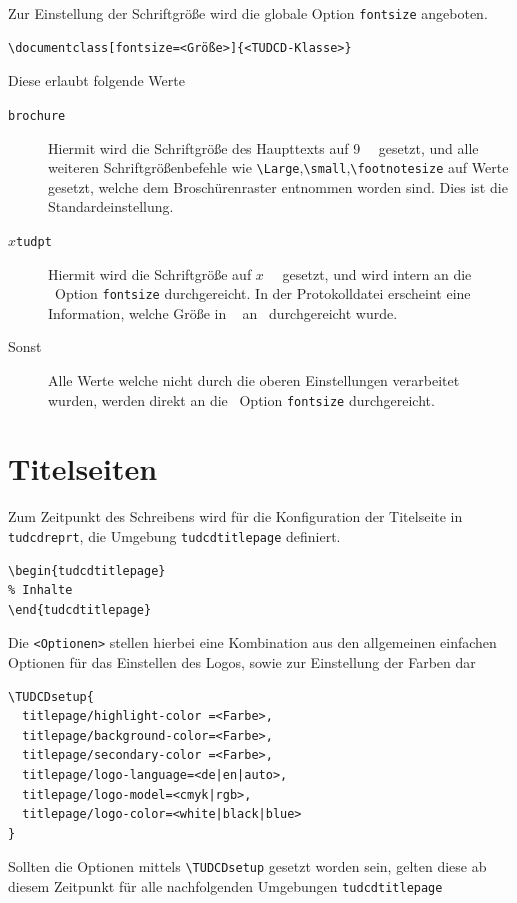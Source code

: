 \documentclass[
  logo={
    color=blue,
    language=de,
    colormodel=rgb
  },
  fontsize=11tudpt,
  usemargin,
  oneside
]{tudcdreprt}
\begin{document}
Zur Einstellung der Schriftgröße wird die globale Option \texttt{fontsize}
angeboten.
\begin{lstlisting}
\documentclass[fontsize=<Größe>]{<TUDCD-Klasse>}
\end{lstlisting}
Diese erlaubt folgende Werte \begin{description}
  \item[\texttt{brochure}] Hiermit wird die Schriftgröße des Haupttexts auf \qty{9}{\texpt\tud} gesetzt,
  und alle weiteren Schriftgrößenbefehle wie \lstinline|\Large|,\lstinline|\small|,\lstinline|\footnotesize| auf
  Werte gesetzt, welche dem Broschürenraster entnommen worden sind.
  Dies ist die Standardeinstellung.
  \item[$x$\texttt{tudpt}] Hiermit wird die Schriftgröße auf $x$~\unit{\texpt\tud} gesetzt, und wird intern an
  die \KOMAScript\  Option \texttt{fontsize} durchgereicht.
  In der Protokolldatei erscheint eine Information, welche Größe in \unit{\texpt\tex} an \KOMAScript\ durchgereicht wurde.
  \item[Sonst] Alle Werte welche nicht durch die oberen Einstellungen verarbeitet wurden, werden direkt an
  die \KOMAScript\  Option \texttt{fontsize} durchgereicht.
\end{description}

\section{Titelseiten}

Zum Zeitpunkt des Schreibens wird für die Konfiguration der Titelseite in \texttt{tudcdreprt},
die Umgebung \texttt{tudcdtitlepage} definiert.

\begin{lstlisting}
\begin{tudcdtitlepage}
% Inhalte
\end{tudcdtitlepage}
\end{lstlisting}

Die \lstinline|<Optionen>| stellen hierbei eine Kombination aus den allgemeinen einfachen Optionen für das Einstellen des Logos,
sowie zur Einstellung der Farben dar
\begin{lstlisting}
\TUDCDsetup{
  titlepage/highlight-color =<Farbe>,
  titlepage/background-color=<Farbe>,
  titlepage/secondary-color =<Farbe>,
  titlepage/logo-language=<de|en|auto>,
  titlepage/logo-model=<cmyk|rgb>,
  titlepage/logo-color=<white|black|blue>
}
\end{lstlisting}
Sollten die Optionen mittels \lstinline|\TUDCDsetup| gesetzt worden sein,
gelten diese ab diesem Zeitpunkt für alle nachfolgenden Umgebungen \texttt{tudcdtitlepage}
\end{document}
